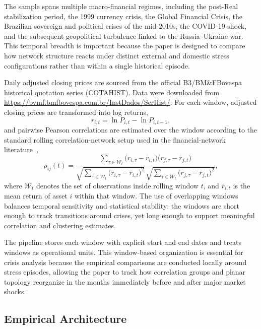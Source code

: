 \documentclass[a4paper,fleqn,review]{cas-sc}
\begin{document}
The sample spans multiple macro-financial regimes, including the post-Real stabilization period, the 1999 currency crisis, the Global Financial Crisis, the Brazilian sovereign and political crises of the mid-2010s, the COVID-19 shock, and the subsequent geopolitical turbulence linked to the Russia--Ukraine war. This temporal breadth is important because the paper is designed to compare how network structure reacts under distinct external and domestic stress configurations rather than within a single historical episode.

Daily adjusted closing prices are sourced from the official B3/BM\&FBovespa historical quotation series (COTAHIST). Data were downloaded from \url{https://bvmf.bmfbovespa.com.br/InstDados/SerHist/}. For each window, adjusted closing prices are transformed into log returns,
\begin{equation}
r_{i,t} = \ln P_{i,t} - \ln P_{i,t-1},
\label{eq:log-return}
\end{equation}
and pairwise Pearson correlations are estimated over the window according to the standard rolling correlation-network setup used in the financial-network literature~\citep{tumminello2010correlation},
\begin{equation}
\rho_{ij}(t) = \frac{\sum_{\tau \in \mathcal{W}_t} \bigl(r_{i,\tau} - \bar{r}_{i,t}\bigr)\bigl(r_{j,\tau} - \bar{r}_{j,t}\bigr)}{\sqrt{\sum_{\tau \in \mathcal{W}_t} \bigl(r_{i,\tau} - \bar{r}_{i,t}\bigr)^2} \, \sqrt{\sum_{\tau \in \mathcal{W}_t} \bigl(r_{j,\tau} - \bar{r}_{j,t}\bigr)^2}},
\label{eq:pearson-correlation}
\end{equation}
where $\mathcal{W}_t$ denotes the set of observations inside rolling window $t$, and $\bar{r}_{i,t}$ is the mean return of asset $i$ within that window. The use of overlapping windows balances temporal sensitivity and statistical stability: the windows are short enough to track transitions around crises, yet long enough to support meaningful correlation and clustering estimates.

The pipeline stores each window with explicit start and end dates and treats windows as operational units. This window-based organization is essential for crisis analysis because the empirical comparisons are conducted locally around stress episodes, allowing the paper to track how correlation groups and planar topology reorganize in the months immediately before and after major market shocks.


\subsection{Empirical Architecture}
\end{document}
